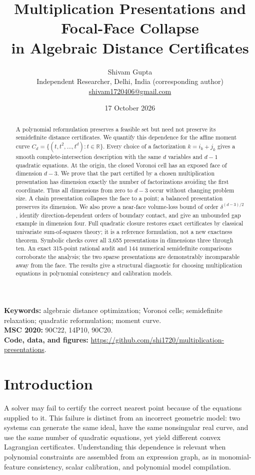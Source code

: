 \documentclass[11pt]{article}
\title{Multiplication Presentations and Focal-Face Collapse\\in Algebraic Distance Certificates}
\author{Shivam Gupta\\\small Independent Researcher, Delhi, India (corresponding author)\\\small\href{mailto:shivam1720406@gmail.com}{shivam1720406@gmail.com}}
\date{17 October 2026}
\theoremstyle{definition}\newtheorem{definition}[theorem]{Definition}
\theoremstyle{remark}\newtheorem{remark}[theorem]{Remark}
\newcommand{\R}{\mathbb{R}}
\begin{document}
\maketitle
\begin{abstract}
A polynomial reformulation preserves a feasible set but need not preserve its semidefinite distance certificates. We quantify this dependence for the affine moment curve $C_d=\{(t,t^2,\ldots,t^d):t\in\R\}$. Every choice of a factorization $k=i_k+j_k$ gives a smooth complete-intersection description with the same $d$ variables and $d-1$ quadratic equations. At the origin, the closed Voronoi cell has an exposed face of dimension $d-3$. We prove that the part certified by a chosen multiplication presentation has dimension exactly the number of factorizations avoiding the first coordinate. Thus all dimensions from zero to $d-3$ occur without changing problem size. A chain presentation collapses the face to a point; a balanced presentation preserves its dimension. We also prove a near-face volume-loss bound of order $\delta^{(d-3)/2}$, identify direction-dependent orders of boundary contact, and give an unbounded gap example in dimension four. Full quadratic closure restores exact certificates by classical univariate sum-of-squares theory; it is a reference formulation, not a new exactness theorem. Symbolic checks cover all 3,655 presentations in dimensions three through ten. An exact 315-point rational audit and 144 numerical semidefinite comparisons corroborate the analysis; the two sparse presentations are demonstrably incomparable away from the face. The results give a structural diagnostic for choosing multiplication equations in polynomial consistency and calibration models.
\end{abstract}
\noindent\textbf{Keywords:} algebraic distance optimization; Voronoi cells; semidefinite relaxation; quadratic reformulation; moment curve.\\
\noindent\textbf{MSC 2020:} 90C22, 14P10, 90C20.\\
\noindent\textbf{Code, data, and figures:} \url{https://github.com/shi1720/multiplication-presentations}.

\section{Introduction}
A solver may fail to certify the correct nearest point because of the equations supplied to it. This failure is distinct from an incorrect geometric model: two systems can generate the same ideal, have the same nonsingular real curve, and use the same number of quadratic equations, yet yield different convex Lagrangian certificates. Understanding this dependence is relevant when polynomial constraints are assembled from an expression graph, as in monomial-feature consistency, scalar calibration, and polynomial model compilation.
\end{document}
